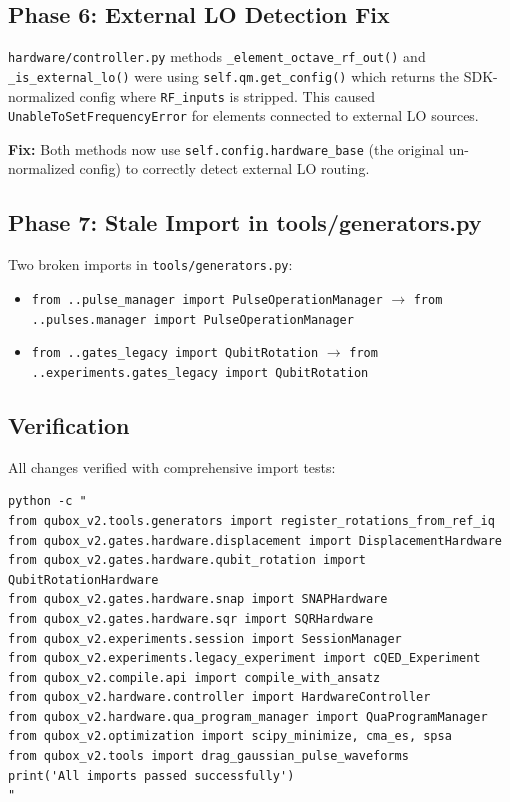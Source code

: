 \documentclass[11pt]{article}
\begin{document}
\subsection{Phase 6: External LO Detection Fix}

\texttt{hardware/controller.py} methods \texttt{\_element\_octave\_rf\_out()}
and \texttt{\_is\_external\_lo()} were using \texttt{self.qm.get\_config()}
which returns the SDK-normalized config where \texttt{RF\_inputs} is stripped.
This caused \texttt{UnableToSetFrequencyError} for elements connected to
external LO sources.

\textbf{Fix:} Both methods now use \texttt{self.config.hardware\_base} (the
original un-normalized config) to correctly detect external LO routing.

\subsection{Phase 7: Stale Import in tools/generators.py}

Two broken imports in \texttt{tools/generators.py}:
\begin{itemize}
  \item \texttt{from ..pulse\_manager import PulseOperationManager}
        $\rightarrow$ \texttt{from ..pulses.manager import PulseOperationManager}
  \item \texttt{from ..gates\_legacy import QubitRotation}
        $\rightarrow$ \texttt{from ..experiments.gates\_legacy import QubitRotation}
\end{itemize}

\subsection{Verification}

All changes verified with comprehensive import tests:
\begin{lstlisting}
python -c "
from qubox_v2.tools.generators import register_rotations_from_ref_iq
from qubox_v2.gates.hardware.displacement import DisplacementHardware
from qubox_v2.gates.hardware.qubit_rotation import QubitRotationHardware
from qubox_v2.gates.hardware.snap import SNAPHardware
from qubox_v2.gates.hardware.sqr import SQRHardware
from qubox_v2.experiments.session import SessionManager
from qubox_v2.experiments.legacy_experiment import cQED_Experiment
from qubox_v2.compile.api import compile_with_ansatz
from qubox_v2.hardware.controller import HardwareController
from qubox_v2.hardware.qua_program_manager import QuaProgramManager
from qubox_v2.optimization import scipy_minimize, cma_es, spsa
from qubox_v2.tools import drag_gaussian_pulse_waveforms
print('All imports passed successfully')
"
\end{lstlisting}
\end{document}
